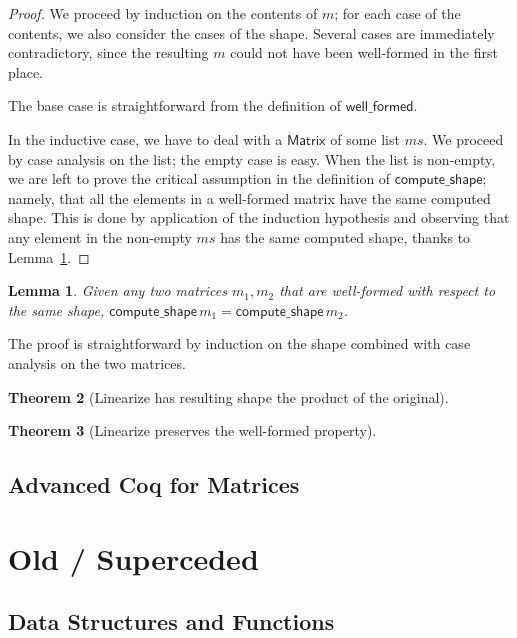 \documentclass[11pt,conference]{IEEEtran}
\newcommand{\var}[1]{\mathit{#1}}
\newcommand{\func}[1]{\mathsf{#1}}
\theoremstyle{plain} %
\newtheorem{thm}{Theorem}[section]
\newtheorem{lem}[thm]{Lemma}
\theoremstyle{definition}
\theoremstyle{remark}
\begin{document}
\begin{proof}
    We proceed by induction on the contents of \(m\); for each case of the
    contents, we also consider the cases of the shape. Several cases are
    immediately contradictory, since the resulting \(m\) could not have been
    well-formed in the first place.

    The base case is straightforward from the definition of
    \(\func{well\_formed}\).

    In the inductive case, we have to deal with a \(\func{Matrix}\) of some list
    \(\var{ms}\). We proceed by case analysis on the list; the empty case is
    easy. When the list is non-empty, we are left to prove the critical
    assumption in the definition of \(\func{compute\_shape}\); namely, that all
    the elements in a well-formed matrix have the same computed shape. This is
    done by application of the induction hypothesis and observing that any
    element in the non-empty \(\var{ms}\) has the same computed shape, thanks to
    Lemma~\ref{Lem:wf_same_shape}.
\end{proof}

\begin{lem}\label{Lem:wf_same_shape}
    Given any two matrices \(m_1, m_2\) that are well-formed with respect to the
    same shape, \(\func{compute\_shape}\, m_1 = \func{compute\_shape}\, m_2\).
\end{lem}

The proof is straightforward by induction on the shape combined with case
analysis on the two matrices.

\begin{thm}[Linearize has resulting shape the product of the original]\label{Th:linearize_product}
\end{thm}

\begin{thm}[Linearize preserves the well-formed property]\label{Th:linearize_wf}
\end{thm}

\subsection{Advanced Coq for Matrices}\label{S:matrix_coq}


\section{Old / Superceded}

\subsection{Data Structures and Functions}
\end{document}
